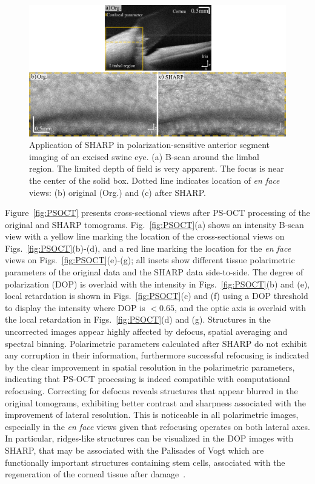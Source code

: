 \begin{figure}[htb!]
	\centering
	\includegraphics[width=\textwidth]{Figures/Results/PSOCT_Int.pdf}
	\caption[Application of SHARP in polarization-sensitive anterior segment imaging of an excised swine eye.]{Application of SHARP in polarization-sensitive anterior segment imaging of an excised swine eye. (a) B-scan around the limbal region. The limited depth of field is very apparent. The focus is near the center of the solid box. Dotted line indicates location of \textit{en face} views: (b) original (Org.) and (c) after SHARP.}
	\label{fig:PSOCT_int}
\end{figure}

Figure~\ref{fig:PSOCT} presents cross-sectional views after PS-OCT processing of the original and SHARP tomograms. Fig.~\ref{fig:PSOCT}(a) shows an intensity B-scan view with a yellow line marking the location of the cross-sectional views on Figs.~\ref{fig:PSOCT}(b)-(d), and a red line marking the location for the \textit{en face} views on Figs.~\ref{fig:PSOCT}(e)-(g); all insets show different tissue polarimetric parameters of the original data and the SHARP data side-to-side. The degree of polarization (DOP) is overlaid with the intensity in Figs.~\ref{fig:PSOCT}(b) and (e), local retardation is shown in Figs.~\ref{fig:PSOCT}(c) and (f) using a DOP threshold to display the intensity where DOP is $<0.65$, and the optic axis is overlaid with the local retardation in Figs.~\ref{fig:PSOCT}(d) and (g). Structures in the uncorrected images appear highly affected by defocus, spatial averaging and spectral binning. Polarimetric parameters calculated after SHARP do not exhibit any corruption in their information, furthermore successful refocusing is indicated by the clear improvement in spatial resolution in the polarimetric parameters, indicating that PS-OCT processing is indeed compatible with computational refocusing. Correcting for defocus reveals structures that appear blurred in the original tomograms, exhibiting better contrast and sharpness associated with the improvement of lateral resolution. This is noticeable in all polarimetric images, especially in the \textit{en face} views given that refocusing operates on both lateral axes. In particular, ridges-like structures can be visualized in the DOP images with SHARP, that may be associated with the Palisades of Vogt which are functionally important structures containing stem cells, associated with the regeneration of the corneal tissue after damage~\cite{Bizheva2017_Invivo}. 

